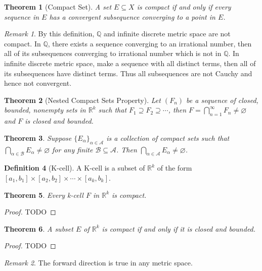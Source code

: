 \documentclass[12pt, lettersize]{book}
\theoremstyle{plain}
\newtheorem{thm}{Theorem}[section]
\theoremstyle{definition}
\newtheorem{dfn}[thm]{Definition}
\theoremstyle{remark}
\newtheorem*{rem}{Remark}
\newcommand{\R}{\mathbb{R}}
\newcommand{\Q}{\mathbb{Q}}
\let\emptyset\varnothing
\begin{document}
		\begin{thm}[Compact Set]
			A set $E\subseteq X$ is compact if and only if every sequence in $E$ has a convergent subsequence converging to a point in $E$.
		\end{thm}
		\begin{rem}
			By this definition, $\Q$ and infinite discrete metric space are not compact. In $\Q$, there exists a sequence converging to an irrational number, then all of its subsequences converging to irrational number which is not in $\Q$. In infinite discrete metric space, make a sequence with all distinct terms, then all of its subsequences have distinct terms. Thus all subsequences are not Cauchy and hence not convergent.
		\end{rem}
		
		\begin{thm}[Nested Compact Sets Property]
			Let $(F_n)$ be a sequence of closed, bounded, nonempty sets in $\R^k$ such that $F_1\supseteq F_2\supseteq\cdots$, then $F=\bigcap_{n=1}^{\infty}F_n\neq\emptyset$ and $F$ is closed and bounded.
		\end{thm}
		
		\begin{thm}
			Suppose $\{E_\alpha\}_{\alpha\in\mathcal{A}}$ is a collection of compact sets such that $\bigcap_{\alpha\in\mathcal{B}}E_\alpha\neq\emptyset$ for any finite $\mathcal{B}\subseteq \mathcal{A}$. Then $\bigcap_{\alpha\in\mathcal{A}}E_\alpha\neq\emptyset$.
		\end{thm}
		
		\begin{dfn}[K-cell]
			A K-cell is a subset of $\R^k$ of the form $[a_1,b_1]\times[a_2,b_2]\times\cdots\times[a_k,b_k]$.
		\end{dfn}
		
		\begin{thm}
			Every k-cell $F$ in $\mathbb{R}^k$ is compact.
		\end{thm}
		\begin{proof}
			TODO
		\end{proof}
		
		\begin{thm}
			A subset $E$ of $\mathbb{R}^k$ is compact if and only if it is closed and bounded.
		\end{thm}
		\begin{proof}
			TODO
		\end{proof}
		\begin{rem}
			The forward direction is true in any metric space.
		\end{rem}
		
\end{document}
